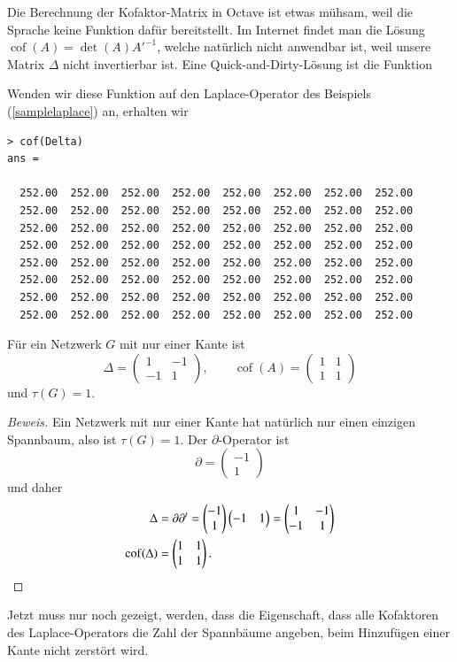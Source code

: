 \begin{beispiel}
Die Berechnung der Kofaktor-Matrix in Octave ist etwas mühsam, weil
die Sprache keine Funktion dafür bereitstellt.
Im Internet findet man die Lösung $\operatorname{cof}(A)=\det(A)A'^{-1}$,
welche natürlich nicht anwendbar ist, weil unsere Matrix $\Delta$
nicht invertierbar ist.
Eine Quick-and-Dirty-Lösung
ist die Funktion

Wenden wir diese Funktion auf den Laplace-Operator des Beispiels
(\ref{samplelaplace}) an, erhalten wir
{\small
\begin{verbatim}
> cof(Delta)
ans =

  252.00  252.00  252.00  252.00  252.00  252.00  252.00  252.00
  252.00  252.00  252.00  252.00  252.00  252.00  252.00  252.00
  252.00  252.00  252.00  252.00  252.00  252.00  252.00  252.00
  252.00  252.00  252.00  252.00  252.00  252.00  252.00  252.00
  252.00  252.00  252.00  252.00  252.00  252.00  252.00  252.00
  252.00  252.00  252.00  252.00  252.00  252.00  252.00  252.00
  252.00  252.00  252.00  252.00  252.00  252.00  252.00  252.00
  252.00  252.00  252.00  252.00  252.00  252.00  252.00  252.00
\end{verbatim}
}
\end{beispiel}

\begin{hilfssatz}
\label{matrixtreetheorem1}
Für ein Netzwerk $G$ mit nur einer Kante ist
\[
\Delta=\begin{pmatrix}
1&-1\\-1&1
\end{pmatrix},
\qquad
\operatorname{cof}(A)=\begin{pmatrix}1&1\\1&1\end{pmatrix}
\]
und
$\tau(G)=1$.
\end{hilfssatz}

\begin{proof}[Beweis]
Ein Netzwerk mit nur einer Kante hat natürlich nur einen einzigen
Spannbaum, also ist $\tau(G)=1$. Der $\partial$-Operator ist
\[
\partial=\begin{pmatrix}-1\\1\end{pmatrix}
\]
und daher
\begin{align*}
\Delta&=
\partial\partial^t=
\begin{pmatrix}-1\\1\end{pmatrix}
\begin{pmatrix}-1&1\end{pmatrix}
=
\begin{pmatrix}
1&-1\\
-1&1
\end{pmatrix}
\\
\operatorname{cof}(\Delta)&=\begin{pmatrix}1&1\\1&1\end{pmatrix}.
\qedhere
\end{align*}
\end{proof}
Jetzt muss nur noch gezeigt, werden, dass die Eigenschaft, dass alle
Kofaktoren des Laplace-Operators die Zahl der Spannbäume angeben,
beim Hinzufügen einer Kante nicht zerstört wird.

